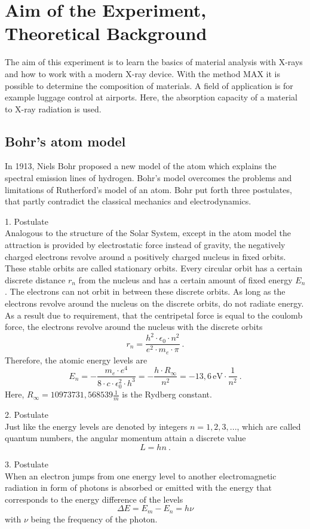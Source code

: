 \chapter{Aim of the Experiment, Theoretical Background}
The aim of this experiment is to learn the basics of material analysis with X-rays and how to work with a modern X-ray device. With the method MAX it is possible to determine the composition of materials. A field of application is for example luggage control at airports. Here, the absorption capacity of a material to X-ray radiation is used.

\section{Bohr's atom model}
In 1913, Niels Bohr proposed a new model of the atom which explains the spectral emission lines of hydrogen. Bohr's model overcomes the problems and limitations of Rutherford's model of an atom. Bohr put forth three postulates, that partly contradict the classical mechanics and electrodynamics.
\begin{description}
\item 1. Postulate\\
Analogous to the structure of the Solar System, except in the atom model the attraction is provided by electrostatic force instead of gravity, the negatively charged electrons revolve around a positively charged nucleus in fixed orbits. These stable orbits are called stationary orbits. Every circular orbit has a certain discrete distance $r_{n}$ from the nucleus and has a certain amount of fixed energy $E_{n}$. The electrons can not orbit in between these discrete orbits. As long as the electrons revolve around the nucleus on the  discrete orbits, do not radiate energy. As a result due to requirement, that the centripetal force is equal to the coulomb force, the electrons revolve around the nucleus with the discrete orbits 
$$r_{n}=\frac{h^{2} \cdot \epsilon_{0} \cdot n^{2}}{e^{2} \cdot m_{e} \cdot \pi}~.$$
Therefore, the atomic energy levels are
$$E_{n}=- \frac{m_{e} \cdot e^{4}}{8 \cdot c \cdot \epsilon^{2}_{0} \cdot h^{3}}=-\frac{h \cdot R_{\infty}}{n^{2}}=-13,6\,\text{eV}\cdot\frac{1}{n^{2}}~.$$
Here, $R_{\infty}=10973731,568539\frac{1}{m}$ is the Rydberg constant. 
\item 2. Postulate\\
Just like the energy levels are denoted by integers $n=1,2,3,...$, which are called quantum numbers, the angular momentum attain a discrete value $$L=hn~.$$
\item 3. Postulate\\
When an electron jumps from one energy level to another electromagnetic radiation in form of photons is absorbed or emitted with the energy that corresponds to the energy difference of the levels $$\Delta E=E_{m}-E_{n}=h\nu$$ 
with $\nu$ being the frequency of the photon.
\end{description}
    

